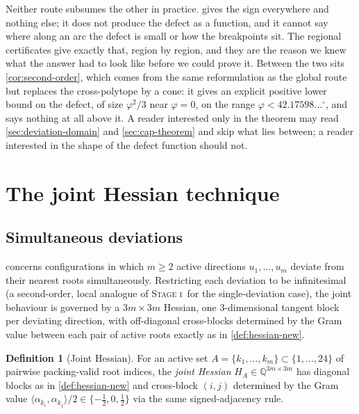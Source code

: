 \documentclass[11pt,reqno]{amsart}
\renewcommand{\_}{\origunderscore\allowbreak}
\numberwithin{equation}{section}
\theoremstyle{plain}
\theoremstyle{definition}
\newtheorem{definition}[thm]{Definition}
\theoremstyle{remark}
\newcommand{\tilt}{\varphi}                  %
\newcommand{\stageone}{\textnormal{\scshape Stage i}}
\begin{document}
Neither route subsumes the other in practice. 
gives the sign everywhere and nothing else; it does not produce the
defect as a function, and it cannot say where along an arc the defect is
small or how the breakpoints sit. The regional certificates give exactly
that, region by region, and they are the reason we knew what the answer
had to look like before we could prove it. Between the two sits
\cref{cor:second-order}, which comes from the same reformulation as the
global route but replaces the cross-polytope by a cone: it gives an
explicit positive lower bound on the defect, of size $\tilt^2/3$ near
$\tilt=0$, on the range $\tilt<42.17598\ldots^\circ$, and says nothing
at all above it. A reader interested only in the theorem may read
\cref{sec:deviation-domain} and \cref{sec:cap-theorem} and skip what
lies between; a reader interested in the shape of the defect function
should not.
\section{The joint Hessian technique}\label{sec:hessian-technique}

\subsection{Simultaneous deviations}

 concerns configurations in which $m\ge2$ active
directions $u_1,\dots,u_m$ deviate from their nearest roots
simultaneously. Restricting each deviation to be infinitesimal (a
second-order, local analogue of \stageone\ for the single-deviation
case), the joint behaviour is governed by a $3m\times3m$ Hessian, one
$3$-dimensional tangent block per deviating direction, with off-diagonal
cross-blocks determined by the Gram value between each pair of active
roots exactly as in \cref{def:hessian-new}.

\begin{definition}[Joint Hessian]\label{def:joint-hessian-new}
For an active set $A=\{k_1,\dots,k_m\}\subset\{1,\dots,24\}$ of pairwise
packing-valid root indices, the \emph{joint Hessian}
$H_A\in\mathbb{Q}^{3m\times3m}$ has diagonal blocks as in
\cref{def:hessian-new} and cross-block $(i,j)$ determined by the
Gram value $\langle\alpha_{k_i},\alpha_{k_j}\rangle/2\in\{-\tfrac12,0,\tfrac12\}$
via the same signed-adjacency rule.
\end{definition}
\end{document}
